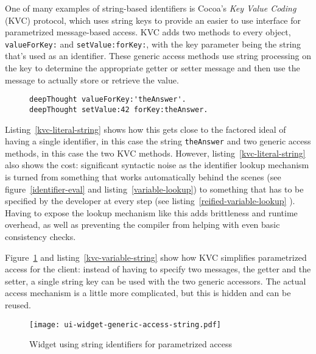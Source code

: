 \documentclass[preprint,authoryear]{acm_proc_article-sp}
\begin{document}
One of many examples of string-based identifiers is Cocoa's {\em Key Value Coding} (KVC)\cite{KVC} protocol,
which uses string keys to provide
an easier to use interface for parametrized message-based access.  
KVC adds two methods to every object, {\tt valueForKey:} and {\tt setValue:forKey:},
with the key parameter being the string that's used as an identifier.  These generic access methods 
use string processing on the key to determine the appropriate getter or setter message and 
then use the message to actually store or retrieve the value.  

\begin{figure}[htbp]
\begin{lstlisting}[style=numbers,label=kvc-literal-string,caption=Strings used with {\em Key Value Coding} (KVC).]
deepThought valueForKey:'theAnswer'.
deepThought setValue:42 forKey:theAnswer.
\end{lstlisting}
\end{figure}

Listing~\ref{kvc-literal-string} shows how this gets close to the factored ideal of having a single identifier,
in this case the string {\tt theAnswer} and two generic access methods, in this case the two KVC methods.
However, listing~\ref{kvc-literal-string} also shows the cost:  significant syntactic noise as the identifier
lookup mechanism is turned from something that works automatically behind the scenes (see figure~\ref{identifier-eval}
and listing~\ref{variable-lookup}) to something that has to be specified by the developer at every step (see 
listing~\ref{reified-variable-lookup} ).   Having to expose the lookup mechanism like this adds brittleness and
runtime overhead, as well as preventing the compiler from helping with even basic consistency checks.


Figure~\ref{ui-widget-string-access} and listing~\ref{kvc-variable-string} show how KVC simplifies parametrized access for 
the client:  instead of having to specify two messages, the getter and the setter, a single string key can be used with
the two generic accessors.  The actual access mechanism is a little more complicated, but this is hidden and can 
be reused.

\begin{figure}[htbp]
\begin{center}
\texttt{[image: ui-widget-generic-access-string.pdf]}
\caption{Widget using string identifiers for parametrized access}
\label{ui-widget-string-access}
\end{center}
\end{figure}
\end{document}
